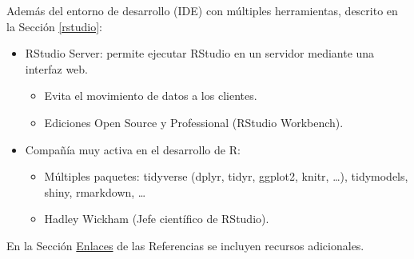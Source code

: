 \documentclass[
]{book}
\theoremstyle{break}
\theoremstyle{nonumberplain}
\begin{document}
Además del entorno de desarrollo (IDE) con múltiples herramientas,
descrito en la Sección \ref{rstudio}:

\begin{itemize}
\item
  RStudio Server: permite ejecutar RStudio en un servidor mediante una interfaz web.

  \begin{itemize}
  \item
    Evita el movimiento de datos a los clientes.
  \item
    Ediciones Open Source y Professional (RStudio Workbench).
  \end{itemize}
\end{itemize}

\begin{itemize}
\item
  Compañía muy activa en el desarrollo de R:

  \begin{itemize}
  \item
    Múltiples paquetes: tidyverse (dplyr, tidyr, ggplot2, knitr, \ldots), tidymodels, shiny, rmarkdown, \ldots{}
  \item
    Hadley Wickham (Jefe científico de RStudio).
  \end{itemize}
\end{itemize}

En la Sección \protect\hyperlink{links}{Enlaces} de las Referencias se incluyen recursos adicionales.

  
\end{document}
